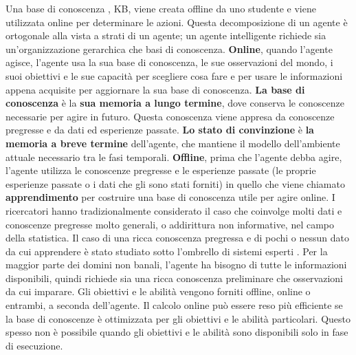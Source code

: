 \documentclass[a4paper]{extarticle}
\begin{document}
Una base di conoscenza , KB, viene creata offline da uno studente e viene utilizzata online per determinare le azioni. Questa decomposizione di un agente è ortogonale alla vista a strati di un agente; un agente intelligente richiede sia un'organizzazione gerarchica che basi di conoscenza. \textbf{Online}, quando l'agente agisce, l'agente usa la sua base di conoscenza, le sue osservazioni del mondo, i suoi obiettivi e le sue capacità per scegliere cosa fare e per usare le informazioni appena acquisite per aggiornare la sua base di conoscenza. \textbf{La base di conoscenza} è la \textbf{sua memoria a lungo termine}, dove conserva le conoscenze necessarie per agire in futuro. Questa conoscenza viene appresa da conoscenze pregresse e da dati ed esperienze passate. \textbf{Lo stato di convinzione} è \textbf{la memoria a breve termine} dell'agente, che mantiene il modello dell'ambiente attuale necessario tra le fasi temporali. \textbf{Offline}, prima che l'agente debba agire, l'agente utilizza le conoscenze pregresse e le esperienze passate (le proprie esperienze passate o i dati che gli sono stati forniti) in quello che viene chiamato \textbf{apprendimento} per costruire una base di conoscenza utile per agire online. I ricercatori hanno tradizionalmente considerato il caso che coinvolge molti dati e conoscenze pregresse molto generali, o addirittura non informative, nel campo della statistica. Il caso di una ricca conoscenza pregressa e di pochi o nessun dato da cui apprendere è stato studiato sotto l'ombrello di sistemi esperti . Per la maggior parte dei domini non banali, l'agente ha bisogno di tutte le informazioni disponibili, quindi richiede sia una ricca conoscenza preliminare che osservazioni da cui imparare. Gli obiettivi e le abilità vengono forniti offline, online o entrambi, a seconda dell'agente. Il calcolo online può essere reso più efficiente se la base di conoscenze è ottimizzata per gli obiettivi e le abilità particolari. Questo spesso non è possibile quando gli obiettivi e le abilità sono disponibili solo in fase di esecuzione.
\end{document}
